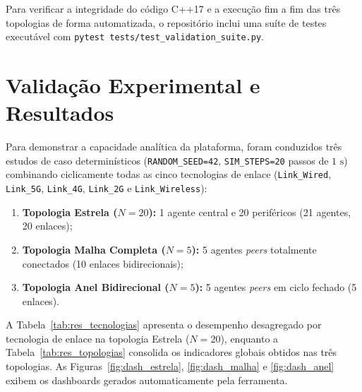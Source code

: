 \documentclass[10pt,twocolumn,a4paper]{article}
\begin{document}
Para verificar a integridade do código C++17 e a execução fim a fim das três topologias de forma automatizada, o repositório inclui uma suíte de testes executável com \texttt{pytest tests/test\_validation\_suite.py}.

\section{Validação Experimental e Resultados}

Para demonstrar a capacidade analítica da plataforma, foram conduzidos três estudos de caso determinísticos (\texttt{RANDOM\_SEED=42}, \texttt{SIM\_STEPS=20} passos de $1\text{ s}$) combinando ciclicamente todas as cinco tecnologias de enlace (\texttt{Link\_Wired}, \texttt{Link\_5G}, \texttt{Link\_4G}, \texttt{Link\_2G} e \texttt{Link\_Wireless}):
\begin{enumerate}
    \item \textbf{Topologia Estrela ($N=20$):} 1 agente central e 20 periféricos (21 agentes, 20 enlaces);
    \item \textbf{Topologia Malha Completa ($N=5$):} 5 agentes \textit{peers} totalmente conectados (10 enlaces bidirecionais);
    \item \textbf{Topologia Anel Bidirecional ($N=5$):} 5 agentes \textit{peers} em ciclo fechado (5 enlaces).
\end{enumerate}

A Tabela~\ref{tab:res_tecnologias} apresenta o desempenho desagregado por tecnologia de enlace na topologia Estrela ($N=20$), enquanto a Tabela~\ref{tab:res_topologias} consolida os indicadores globais obtidos nas três topologias. As Figuras~\ref{fig:dash_estrela}, \ref{fig:dash_malha} e \ref{fig:dash_anel} exibem os dashboards gerados automaticamente pela ferramenta.
\end{document}
